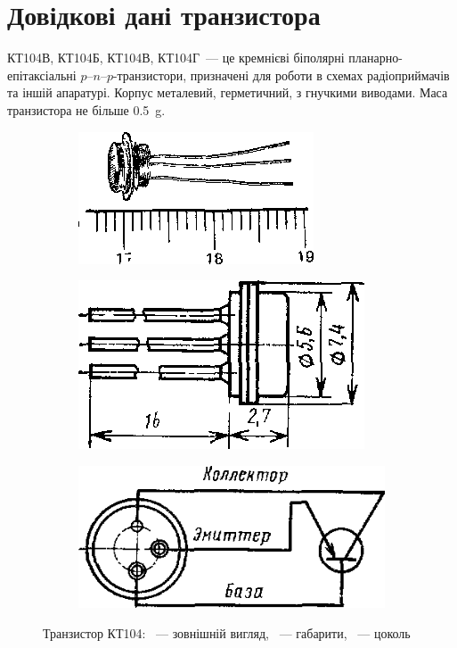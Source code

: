 \documentclass[14pt,ukrainian,utf8,simple]{eskdtext}
\let\stdsection\section
\renewcommand\section{\newpage\stdsection}
\begin{document}
	\section*{Довідкові дані транзистора}
		КТ104В, КТ104Б, КТ104В, КТ104Г~— це кремнієві біполярні планарно-епітаксіальні \mbox{$p$–$n$–$p$}-транзистори, призначені для роботи в схемах радіоприймачів та іншій апаратурі. Корпус металевий, герметичний, з гнучкими виводами. Маса транзистора не більше \SI{0,5}{\gram}.
		
		\begin{figure}[!htbp]
		\centering
			\begin{subfigure}[b]{0.3\textwidth}
			\centering
				\includegraphics[height = 3\baselineskip]{assets/01-kt104-view.png}
			\caption{}
			\label{subfig:kt104-view}
			\end{subfigure}
			\quad
			\begin{subfigure}[b]{0.3\textwidth}
			\centering
				\includegraphics[height = 3\baselineskip]{assets/02a-kt104-view-sizes.png}
			\caption{}
			\label{subfig:kt104-sizes}
			\end{subfigure}
			\quad
			\begin{subfigure}[b]{0.3\textwidth}
			\centering
				\includegraphics[height = 3\baselineskip]{assets/02b-kt104-view-disambig.png}
			\caption{}
			\label{subfig:kt104-disambig}
			\end{subfigure}
		\caption{Транзистор КТ104: ~— зовнішній вигляд, ~— габарити, ~— цоколь}
		\end{figure}
		
\end{document}
